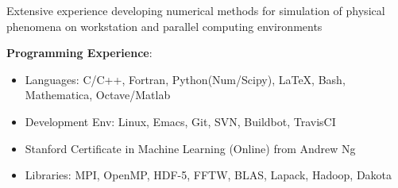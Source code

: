 Extensive experience developing numerical methods for simulation of
physical phenomena on workstation and parallel computing environments 

\blankline

\textbf{Programming Experience}: 
 \begin{itemize}
  \itemsep 0pt
  \item Languages: C/C++, Fortran, Python(Num/Scipy), \LaTeX{}, Bash, Mathematica, Octave/Matlab
  \item Development Env: Linux, Emacs, Git, SVN, Buildbot, TravisCI
  \item Stanford Certificate in Machine Learning (Online) from Andrew Ng
  \item Libraries: MPI, OpenMP, HDF-5, FFTW, BLAS, Lapack, Hadoop, Dakota
 \end{itemize}
